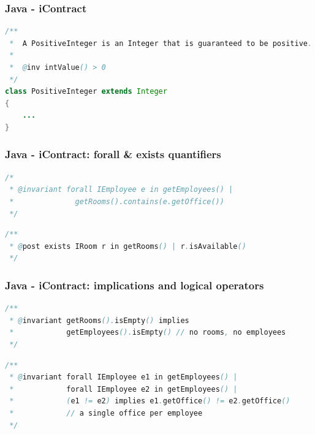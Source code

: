 \documentclass{beamer}
\begin{document}
\begin{frame}[fragile]
\frametitle{Java - iContract}
\begin{lstlisting}[language=Java]
/**
 *  A PositiveInteger is an Integer that is guaranteed to be positive.
 *
 *  @inv intValue() > 0
 */
class PositiveInteger extends Integer
{
    ...
}
\end{lstlisting}
\end{frame}

\begin{frame}[fragile]
\frametitle{Java - iContract: forall \& exists quantifiers}
\begin{lstlisting}[language=Java,caption=http://www.javaworld.com/article/2074956/learn-java/icontract--design-by-contract-in-java.html]
/*
 * @invariant forall IEmployee e in getEmployees() |
 *              getRooms().contains(e.getOffice())
 */
\end{lstlisting}
\begin{lstlisting}[language=Java]
/**
 * @post exists IRoom r in getRooms() | r.isAvailable()
 */
\end{lstlisting}
\end{frame}

\begin{frame}[fragile]
\frametitle{Java - iContract: implications and logical operators}
\begin{lstlisting}[language=Java,caption=http://www.javaworld.com/article/2074956/learn-java/icontract--design-by-contract-in-java.html]
/**
 * @invariant getRooms().isEmpty() implies
 *            getEmployees().isEmpty() // no rooms, no employees
 */
\end{lstlisting}
\begin{lstlisting}[language=Java] 
/**
 * @invariant forall IEmployee e1 in getEmployees() |
 *            forall IEmployee e2 in getEmployees() |
 *            (e1 != e2) implies e1.getOffice() != e2.getOffice()
 *            // a single office per employee
 */
\end{lstlisting}
\end{frame}
\end{document}
